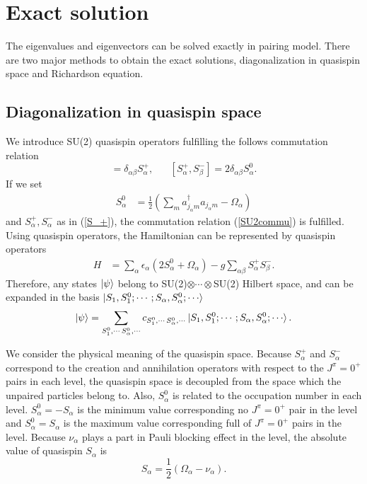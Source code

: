 \documentclass[11pt]{book} %
\begin{document}
\section{Exact solution}
The eigenvalues and eigenvectors can be solved exactly in pairing model. There are two major methods to obtain the exact solutions, diagonalization in quasispin space and Richardson equation.

\subsection{Diagonalization in quasispin space}
We introduce SU(2) quasispin operators fulfilling the follows commutation relation
\begin{equation}
  [S_{\alpha}^0,S_{\beta}^{+}] = \delta_{\alpha\beta}S_{\alpha}^{+},\hspace{20pt}[S_{\alpha}^{+},S_{\beta}^{-}] = 2\delta_{\alpha\beta}S_{\alpha}^{0}. 
  \label{SU2commu}
\end{equation}
If we set 
\begin{align}
  S_{\alpha}^0 &= \frac{1}{2}(\sum_ma_{j_\alpha m}^{\dag}a_{j_\alpha m}-\Omega_{\alpha})
  \label{S_0}
\end{align}
and $S_{\alpha}^+, S_{\alpha}^-$ as in (\ref{S_+}), the commutation relation (\ref{SU2commu}) is fulfilled. Using quasispin operators, the Hamiltonian can be represented by quasispin operators
\begin{align}
	H &= \sum_{\alpha} \epsilon_{\alpha} (2S_{\alpha}^0+\Omega_{\alpha}) - g \sum_{\alpha\beta} S_{\alpha}^+ S_{\beta}^- .
\end{align}
Therefore, any states $\ket{\psi}$ belong to SU(2)$\otimes\cdots\otimes$SU(2) Hilbert space, and can be expanded in the basis $\ket{S_1,S_1^0;\cdots;S_{\alpha},S_{\alpha}^0;\cdots}$
\begin{equation}
  \ket{\psi} = \sum_{S_1^0,\cdots\,S_{\alpha}^0,\cdots}c_{S_1^0,\cdots\,S_{\alpha}^0,\cdots}\ket{S_1,S_1^0;\cdots;S_{\alpha},S_{\alpha}^0;\cdots} .
\end{equation}

We consider the physical meaning of the quasispin space. Because $S_{\alpha}^+$ and $S_{\alpha}^-$ correspond to the creation and annihilation operators with respect to the $J^{\pi}=0^+$ pairs in each level, the quasispin space is decoupled from the space which the unpaired particles belong to. 
Also, $S_{\alpha}^0$ is related to the occupation number in each level. $S_{\alpha}^0=-S_{\alpha}$ is the minimum value corresponding no $J^{\pi}=0^+$ pair in the level and $S_{\alpha}^0=S_{\alpha}$ is the maximum value corresponding full of $J^{\pi}=0^+$ pairs in the level. Because $\nu_{\alpha}$ plays a part in Pauli blocking effect in the level, the absolute value of quasispin $S_{\alpha}$ is
\begin{equation}
  S_{\alpha} = \frac{1}{2}(\Omega_{\alpha}-\nu_{\alpha}).
\end{equation}
\end{document}
